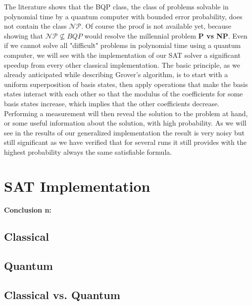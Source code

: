 \documentclass[english]{article}
\begin{document}
			The literature shows that the BQP class, the class of problems solvable in polynomial time by a quantum computer with bounded error probability, does not contain the class $\mathcal{N}\mathcal{P}$. Of course the proof is not available yet, because showing that $\mathcal{N}\mathcal{P}\nsubseteq BQP$ would resolve the millennial problem \textbf{P vs NP}. Even if we cannot solve all "difficult" problems in polynomial time using a quantum computer, we will see with the implementation of our SAT solver a significant speedup from every other classical implementation. The basic principle, as we already anticipated while describing Grover's algorithm, is to start with a uniform superposition of basis states, then apply operations that make the basis states interact with each other so that the modulus of the coefficients for some basis states increase, which implies that the other coefficients decrease. Performing a measurement will then reveal the solution to the problem at hand, or some useful information about the solution, with high probability. As we will see in the results of our generalized implementation the result is very noisy but still significant as we have verified that for several runs it still provides with the highest probability always the same satisfiable formula.
		
	\section{SAT Implementation}
	\label{sec:satImpl}
		
	
		\paragraph{Conclusion n:} \label{conc:queryCompl}
		
		\subsection{Classical}
		\label{sec:satClassical}
		
		\subsection{Quantum}
		\label{sec:satQuantum}
		
		\subsection{Classical vs. Quantum}
		\label{sec:satCsatQ}
		
\end{document}
